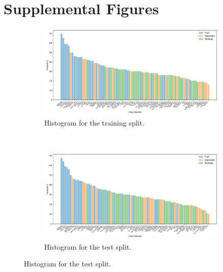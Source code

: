 

\section*{Supplemental Figures}
\label{paperB:supp:supplemental_figures}

\begin{figure}[ht!]
    \centering
    \begin{minipage}{0.95\textwidth}
        \centering
        \begin{subfigure}[t]{0.82\linewidth}
        	\centering
        	\includegraphics[width=\textwidth]{PaperB/appendix/figures/class_distributions_histogram/class_dist_train.png}
        	\caption{Histogram for the training split.}
        	\label{fig:class_distribution_train}
        \end{subfigure} \\
        \begin{subfigure}[t]{0.82\linewidth}
			\centering
			\includegraphics[width=\textwidth]{PaperB/appendix/figures/class_distributions_histogram/class_dist_test.png}
			\caption{Histogram for the test split.}
			\label{fig:class_distribution_test}

\end{subfigure}
\end{minipage}
\end{figure}
